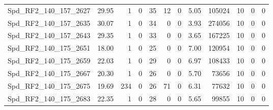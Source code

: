 \begin{longtable}[c]{@{}lrrrrrrrrrrr@{}}
Spd\_RF2\_140\_157\_2627     & 29.95                  & 1                       & 0                       & 35                     & 12                      & 0                       & 5.05                    & 105024                   & 10                       & 0                        & 0                        \\
Spd\_RF2\_140\_157\_2635     & 30.07                  & 1                       & 0                       & 34                     & 0                       & 0                       & 3.93                    & 274056                   & 10                       & 0                        & 0                        \\
Spd\_RF2\_140\_157\_2643     & 29.35                  & 1                       & 0                       & 33                     & 0                       & 0                       & 3.65                    & 167225                   & 10                       & 0                        & 0                        \\
Spd\_RF2\_140\_175\_2651     & 18.00                  & 1                       & 0                       & 25                     & 0                       & 0                       & 7.00                    & 120954                   & 10                       & 0                        & 0                        \\
Spd\_RF2\_140\_175\_2659     & 22.03                  & 1                       & 0                       & 29                     & 0                       & 0                       & 6.97                    & 108433                   & 10                       & 0                        & 0                        \\
Spd\_RF2\_140\_175\_2667     & 20.30                  & 1                       & 0                       & 26                     & 0                       & 0                       & 5.70                    & 73656                    & 10                       & 0                        & 0                        \\
Spd\_RF2\_140\_175\_2675     & 19.69                  & 234                     & 0                       & 26                     & 71                      & 0                       & 6.31                    & 77632                    & 10                       & 0                        & 0                        \\
Spd\_RF2\_140\_175\_2683     & 22.35                  & 1                       & 0                       & 28                     & 0                       & 0                       & 5.65                    & 99855                    & 10                       & 0                        & 0                        \\

\end{longtable}
